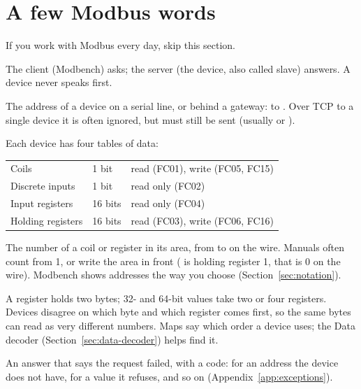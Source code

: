 \section{A few Modbus words}

If you work with Modbus every day, skip this section.

\begin{description}[style=nextline, leftmargin=0pt, font=\intermedium]
  \item[Client and server] The client (Modbench) asks; the server (the
    device, also called slave) answers. A device never speaks first.
  \item[Unit ID] The address of a device on a serial line, or behind a
    gateway:  to . Over TCP to a single device it is often
    ignored, but must still be sent (usually  or ).
  \item[Areas] Each device has four tables of data:
    \begin{center}
    \begin{tabularx}{0.9\linewidth}{l l L}
      \toprule
       &  &  \\
      \midrule
      Coils & 1 bit & read (FC01), write (FC05, FC15) \\
      Discrete inputs & 1 bit & read only (FC02) \\
      Input registers & 16 bits & read only (FC04) \\
      Holding registers & 16 bits & read (FC03), write (FC06, FC16) \\
      \bottomrule
    \end{tabularx}
    \end{center}
  \item[Address] The number of a coil or register in its area, from 
    to  on the wire. Manuals often count from 1, or write the area
    in front ( is holding register 1, that is 0 on the wire).
    Modbench shows addresses the way you choose (Section~\ref{sec:notation}).
  \item[Byte and word order] A register holds two bytes; 32- and 64-bit values
    take two or four registers. Devices disagree on which byte and which
    register comes first, so the same bytes can read as very different
    numbers. Maps say which order a device uses; the Data decoder
    (Section~\ref{sec:data-decoder}) helps find it.
  \item[Exception] An answer that says the request failed, with a code:
     for an address the device does not have,  for a value it
    refuses, and so on (Appendix~\ref{app:exceptions}).
\end{description}


